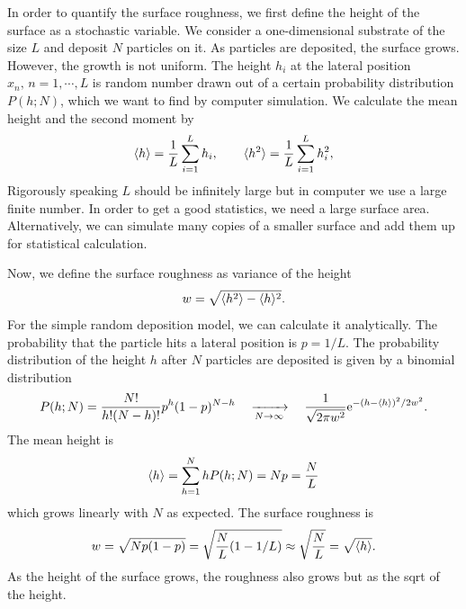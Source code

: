 In order to quantify the surface roughness, we first define the height of the surface as a stochastic variable. We consider a one-dimensional substrate of the size $L$ and deposit $N$ particles on it.  As particles are deposited, the surface grows.  However, the growth is not uniform. The height $h_i$ at the lateral position $x_n,\, n=1,\cdots, L$ is random number drawn out of a certain probability distribution $P(h;N)$, which we want to find by computer simulation. 
We calculate the mean height and the second moment by
\begin{equation}
\langle h \rangle = \frac{1}{L} \sum_{i=1}^L h_i, \qquad \langle h^2 \rangle = \frac{1}{L} \sum_{i=1}^L h_i^2,
\end{equation}
Rigorously speaking $L$ should be infinitely large but in computer we use a large finite number.  In order to get a good statistics, we need a large surface area.  Alternatively, we can simulate many copies of a smaller surface and add them up for statistical calculation. 

Now, we define the surface roughness as variance of the height
\begin{equation}
w = \sqrt{\langle h^2 \rangle-\langle h \rangle^2}.
\end{equation}
For the simple random deposition model, we can calculate it analytically.  The probability that the particle hits a lateral position is $p=1/L$.  The probability distribution of the height $h$ after $N$ particles are deposited is given by a binomial distribution
\begin{equation}
P(h;N) = \frac{N!}{h! (N-h)!} p^h (1-p)^{N-h}\quad \xrightarrow[N \rightarrow \infty]{}\quad \frac{1}{\sqrt{2\pi w^2}} \text{e}^{-(h-\langle h \rangle)^2/2 w^2}.
\end{equation}
The mean height is 
\begin{equation}
\langle h \rangle = \sum_{h=1}^{N} h P(h;N) = N p = \frac{N}{L}
\end{equation}
which grows linearly with $N$ as expected.  The surface roughness is 
\begin{equation}\label{eq:roughness_evolution}
w = \sqrt{N p (1-p)} = \sqrt{\frac{N}{L}(1-1/L)} \approx \sqrt{\frac{N}{L}} = \sqrt{\langle h \rangle}.
\end{equation}
As the height of the surface grows, the roughness also grows but as the sqrt of the height.

